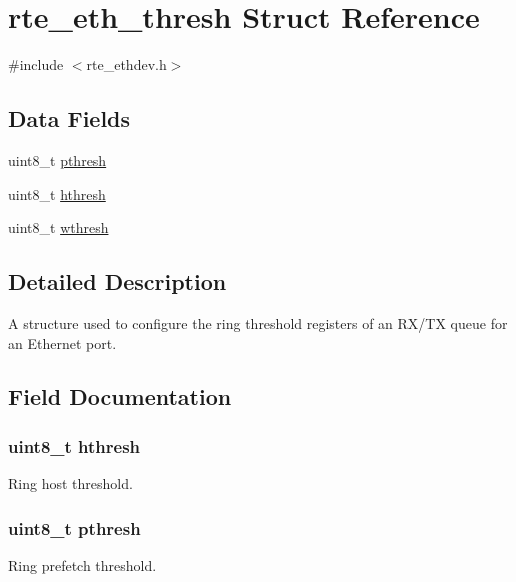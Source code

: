 \hypertarget{structrte__eth__thresh}{}\section{rte\+\_\+eth\+\_\+thresh Struct Reference}
\label{structrte__eth__thresh}


{\ttfamily \#include $<$rte\+\_\+ethdev.\+h$>$}

\subsection*{Data Fields}
\begin{DoxyCompactItemize}
\item 
uint8\+\_\+t \hyperlink{structrte__eth__thresh_aab008c7d0d90ef18966c5237a59f5033}{pthresh}
\item 
uint8\+\_\+t \hyperlink{structrte__eth__thresh_a3e64cc50a50d92041cb032a34e5fb3ce}{hthresh}
\item 
uint8\+\_\+t \hyperlink{structrte__eth__thresh_aae1d4b493bdad178b16dc85edb2ab3ae}{wthresh}
\end{DoxyCompactItemize}


\subsection{Detailed Description}
A structure used to configure the ring threshold registers of an R\+X/\+T\+X queue for an Ethernet port. 

\subsection{Field Documentation}
\hypertarget{structrte__eth__thresh_a3e64cc50a50d92041cb032a34e5fb3ce}{}
\subsubsection[{hthresh}]{\setlength{\rightskip}{0pt plus 5cm}uint8\+\_\+t hthresh}\label{structrte__eth__thresh_a3e64cc50a50d92041cb032a34e5fb3ce}
Ring host threshold. \hypertarget{structrte__eth__thresh_aab008c7d0d90ef18966c5237a59f5033}{}
\subsubsection[{pthresh}]{\setlength{\rightskip}{0pt plus 5cm}uint8\+\_\+t pthresh}\label{structrte__eth__thresh_aab008c7d0d90ef18966c5237a59f5033}
Ring prefetch threshold. \hypertarget{structrte__eth__thresh_aae1d4b493bdad178b16dc85edb2ab3ae}{}
